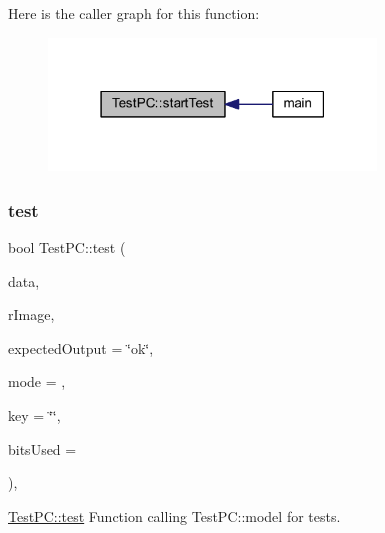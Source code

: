 Here is the caller graph for this function\+:
\nopagebreak
\begin{figure}[H]
\begin{center}
\leavevmode
\includegraphics[width=247pt]{class_test_p_c_ad0d724439a65d183d3d336b667cb867b_icgraph}
\end{center}
\end{figure}
\mbox{\label{class_test_p_c_a612a0409006417c6f03e1749bca0d45a}} 
\subsubsection{\texorpdfstring{test}{test}}
{\footnotesize\ttfamily bool Test\+P\+C\+::test (\begin{DoxyParamCaption}\item[{Q\+Byte\+Array}]{data,  }\item[{Q\+Image}]{r\+Image,  }\item[{Q\+String}]{expected\+Output = {\ttfamily \char`\"{}ok\char`\"{}},  }\item[{int}]{mode = {},  }\item[{Q\+String}]{key = {\ttfamily \char`\"{}\char`\"{}},  }\item[{int}]{bits\+Used = {} }\end{DoxyParamCaption})\hspace{0.3cm}{\ttfamily [protected]}, {\ttfamily [slot]}}



\mbox{\hyperlink{class_test_p_c_a612a0409006417c6f03e1749bca0d45a}{Test\+P\+C\+::test}} Function calling Test\+P\+C\+::model for tests. 


